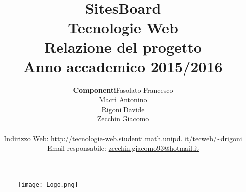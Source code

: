 \documentclass[12pt]{article}
\begin{document}
\begin{figure}
\centering
\texttt{[image: Logo.png]}
\end{figure} 

\title{ \textbf{{\Huge SitesBoard}}\vspace{2cm} \\ {\Huge Tecnologie Web \\ Relazione del progetto} \\ {\Large Anno accademico 2015/2016} }
 
\author{
\begin{tabular}{r|l}
\textbf{Componenti} & Fasolato Francesco\\
&Macrì Antonino\\
&Rigoni Davide\\
&Zecchin Giacomo
\end{tabular}\vspace{0.5cm} \\
	Indirizzo Web: \url{http://tecnologie-web.studenti.math.unipd. it/tecweb/~drigoni}\vspace{0.3cm} \\
		Email responsabile: \href{mailto:zecchin.giacomo93@hotmail.it}{zecchin.giacomo93@hotmail.it} 
}

\maketitle
\thispagestyle{empty}


\newpage


\pagestyle{fancy}
\lhead{}
\cfoot{}
\renewcommand{\footrulewidth}{0.5pt}

\tableofcontents %



\newpage
\end{document}
